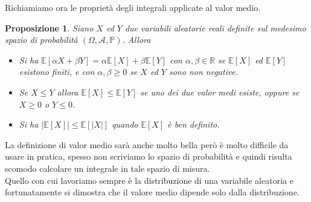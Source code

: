 \documentclass[11pt]{book}
\theoremstyle{Definizione}
\theoremstyle{TeoremaProposizioneLemmaCorollario}
\newtheorem{mypropo}[myteo]{Proposizione}
\theoremstyle{OsservazioneNota}
\newcommand{\R}{\mathbb{R}}
\renewcommand{\P}{\mathbb{P}}
\newcommand{\E}{\mathbb{E}}
\begin{document}
Richiamiamo ora le proprietà degli integrali applicate al valor medio.
\begin{boxpro}
\begin{mypropo}
Siano $X$ ed $Y$ due variabili aleatorie reali definite sul medesimo spazio di probabilità $(\Omega,\mathcal{A},\P)$. Allora
\begin{itemize}
\item[$(i)$] Si ha $\E[\alpha X+\beta Y] = \alpha \E[X]+\beta\E[Y]$ con $\alpha,\beta\in \R$ se $\E[X]$ ed $\E[Y]$ esistono finiti, e con $\alpha,\beta\geq 0$ se $X$ ed $Y$ sono non negative.
\item[$(ii)$] Se $X \leq Y$ allora $\E[X]\leq \E[Y]$ se uno dei due valor medi esiste, oppure se $X \geq 0$ o $Y \leq 0$.
\item[$(iii)$] Si ha $|\E[X]| \leq \E[|X|]$ quando $\E[X]$ è ben definito.
\end{itemize}
\end{mypropo}
\end{boxpro}
\noindent
La definizione di valor medio sarà anche molto bella però è molto difficile da usare in pratica, spesso non scriviamo lo spazio di probabilità e quindi risulta scomodo calcolare un integrale in tale spazio di misura.\\
Quello con cui lavoriamo sempre è la distribuzione di una variabile aleatoria e fortunatamente si dimostra che il valore medio dipende solo dalla distribuzione.
\end{document}
